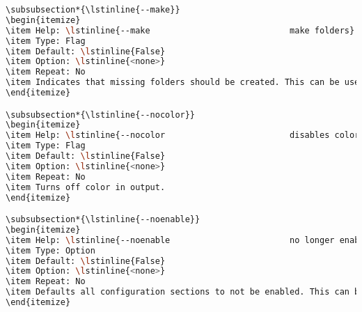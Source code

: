 \begin{snugshade}
\begin{lstlisting}[language=bash]
\subsubsection*{\lstinline{--make}}
\begin{itemize}
\item Help: \lstinline{--make                            make folders}
\item Type: Flag
\item Default: \lstinline{False}
\item Option: \lstinline{<none>}
\item Repeat: No
\item Indicates that missing folders should be created. This can be useful when folders will need to be generated because of \lstinline{--file FILE} command line option.
\end{itemize}

\subsubsection*{\lstinline{--nocolor}}
\begin{itemize}
\item Help: \lstinline{--nocolor                         disables colorized output}
\item Type: Flag
\item Default: \lstinline{False}
\item Option: \lstinline{<none>}
\item Repeat: No
\item Turns off color in output.
\end{itemize}

\subsubsection*{\lstinline{--noenable}}
\begin{itemize}
\item Help: \lstinline{--noenable                        no longer enable any sections}
\item Type: Option
\item Default: \lstinline{False}
\item Option: \lstinline{<none>}
\item Repeat: No
\item Defaults all configuration sections to not be enabled. This can be changed later for each configuration section with other command line options.
\end{itemize}


\end{lstlisting}
\end{snugshade}
